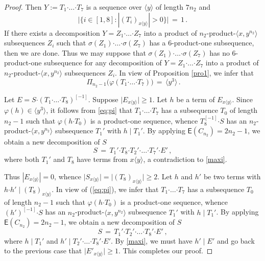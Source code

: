 \documentclass[leqno,a4paper]{amsart}
\def\bd{{\boldsymbol{\cdot}}}
\theoremstyle{plain}
\theoremstyle{definition}
\numberwithin{equation}{section}
\begin{document}
\begin{proof}
		Then $Y:=T_1 \bd \ldots \bd T_7$ is a sequence over $\langle y \rangle$ of length $7n_2$ and
		\[
			\big| \{i\in [1,8]\colon |(T_i)_{x\langle y\rangle}| > 0 \} \big| \, = \, 1 \,.
		\]
		If there exists a decomposition $Y=Z_1\bd \ldots \bd Z_7$ into a product of  $n_2$-product-$\langle x, y^{n_2} \rangle$ subsequences $Z_i$ such that $\sigma (Z_1) \bd \ldots \bd \sigma (Z_7)$ has a 6-product-one subsequence, then we are done.
		Thus we may suppose that $\sigma (Z_1) \bd \ldots \bd \sigma (Z_7)$ has no 6-product-one subsequence for any decomposition of $Y=Z_1\bd \ldots \bd Z_7$ into a product of  $n_2$-product-$\langle x, y^{n_2} \rangle$ subsequences $Z_i$.
		In view of Proposition \ref{pro1}, we infer that
		\begin{equation} \label{eq:pi}~
		  \Pi_{n_2 - 1} \big( \varphi (T_1 \bd \ldots \bd T_7) \big) \, = \, \langle y^{3} \rangle \,.
		\end{equation}
		
		
		Let $E = S \bd (T_1 \bd \ldots \bd T_8)^{[-1]}$.
		Suppose $\big| E_{x\langle y\rangle } \big| \ge 1$. Let $h$ be a term of  $E_{x\langle y\rangle }$. Since $\varphi(h)\in \langle y^3\rangle$,  it follows from \eqref{eq:pi}  that $T_1 \bd \ldots \bd T_7$ has a subsequence $T_0$ of length $n_2 -1$ such that $\varphi (h \bd T_0 )$ is a product-one sequence, whence $T_8^{[-1]} \bd S$ has an $n_2$-product-$\langle x,y^{n_2} \rangle$ subsequence $T_1'$ with $h \mid T_1'$.
		By applying $\mathsf E (C_{n_2}) = 2n_2 - 1$, we obtain a new decomposition of $S$
		\[
		  S \, = \, T_1'  \bd T_8 \bd T_2' \bd \ldots  \bd T_7' \bd E' \,,
		\]
		where both $T_1'$ and $T_8$ have terms from $x \langle y\rangle$, a contradiction to \eqref{maxi}.
		
		
		Thus $|E_{x\langle y\rangle }| = 0$, whence $\big| S_{x\langle y\rangle} \big| = \big| (T_8)_{x\langle y\rangle} \big| \ge 2$. Let $h$ and $h'$ be two terms with $h \bd h'\mid (T_8)_{x\langle y\rangle}$.
		In view of (\ref{eq:pi}), we infer that  $T_1 \bd \ldots \bd T_7$ has a subsequence $T_0$ of length $n_2 - 1$ such that $\varphi (h \bd T_0)$ is a product-one sequence, whence $(h')^{[-1]} \bd S$ has an $n_2$-product-$\langle x,y^{n_2} \rangle$ subsequence $T_1'$ with $h \mid T_1'$.
		By applying  $\mathsf E (C_{n_2}) = 2n_2 - 1$, we  obtain a new decomposition of $S$
		\[
		  S \, = \, T_1' \bd T_2' \bd \ldots \bd T_8' \bd E' \,,
		\]
		where  $h \mid T_1'$ and $h'\mid T_2' \bd \ldots \bd T_8' \bd E'$.
	    By \eqref{maxi}, we must have $h'\mid E'$ and go back to  the previous case that $\big| E'_{x\langle y\rangle } \big| \ge 1$.
		This completes our proof.
	\end{proof}
	
\end{document}
